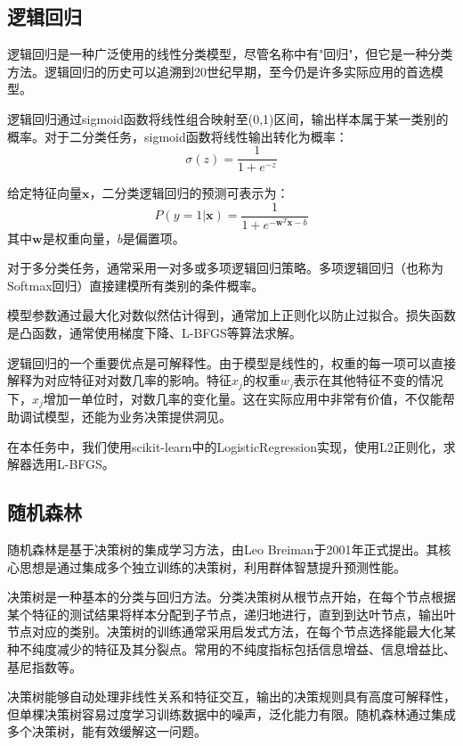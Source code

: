 \documentclass[12pt,a4paper]{article}
\begin{document}
\subsection{逻辑回归}

逻辑回归是一种广泛使用的线性分类模型，尽管名称中有"回归"，但它是一种分类方法。逻辑回归的历史可以追溯到20世纪早期，至今仍是许多实际应用的首选模型。

逻辑回归通过sigmoid函数将线性组合映射至(0,1)区间，输出样本属于某一类别的概率。对于二分类任务，sigmoid函数将线性输出转化为概率：
\begin{equation}
    \sigma(z) = \frac{1}{1 + e^{-z}}
\end{equation}

给定特征向量$\boldsymbol{x}$，二分类逻辑回归的预测可表示为：
\begin{equation}
    P(y=1|\boldsymbol{x}) = \frac{1}{1 + e^{-\boldsymbol{w}^T\boldsymbol{x} - b}}
\end{equation}
其中$\boldsymbol{w}$是权重向量，$b$是偏置项。

对于多分类任务，通常采用一对多或多项逻辑回归策略。多项逻辑回归（也称为Softmax回归）直接建模所有类别的条件概率。

模型参数通过最大化对数似然估计得到，通常加上正则化以防止过拟合。损失函数是凸函数，通常使用梯度下降、L-BFGS等算法求解。

逻辑回归的一个重要优点是可解释性。由于模型是线性的，权重的每一项可以直接解释为对应特征对对数几率的影响。特征$x_j$的权重$w_j$表示在其他特征不变的情况下，$x_j$增加一单位时，对数几率的变化量。这在实际应用中非常有价值，不仅能帮助调试模型，还能为业务决策提供洞见。

在本任务中，我们使用scikit-learn中的LogisticRegression实现，使用L2正则化，求解器选用L-BFGS。

\subsection{随机森林}

随机森林是基于决策树的集成学习方法，由Leo Breiman于2001年正式提出\cite{Breiman2001}。其核心思想是通过集成多个独立训练的决策树，利用群体智慧提升预测性能。

决策树是一种基本的分类与回归方法。分类决策树从根节点开始，在每个节点根据某个特征的测试结果将样本分配到子节点，递归地进行，直到到达叶节点，输出叶节点对应的类别。决策树的训练通常采用启发式方法，在每个节点选择能最大化某种不纯度减少的特征及其分裂点。常用的不纯度指标包括信息增益、信息增益比、基尼指数等。

决策树能够自动处理非线性关系和特征交互，输出的决策规则具有高度可解释性，但单棵决策树容易过度学习训练数据中的噪声，泛化能力有限。随机森林通过集成多个决策树，能有效缓解这一问题。
\end{document}
